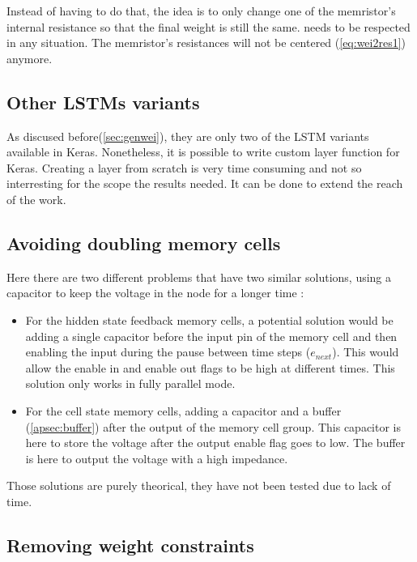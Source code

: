 Instead of having to do that, the idea is to only change one of the memristor's internal resistance so that the final weight is still the same.  needs to be respected in any situation. The memristor's resistances will not be centered (\cref{eq:wei2res1}) anymore.

\subsection{Other \acp{LSTM} variants}

As discused before(\cref{sec:genwei}), they are only two of the \ac{LSTM} variants available in Keras. Nonetheless, it is possible to write custom layer function for Keras. Creating a layer from scratch is very time consuming and not so interresting for the scope the results needed. It can be done to extend the reach of the work.

\subsection{Avoiding doubling memory cells}\label{subsec:noDoubleMemcell}

Here there are two different problems that have two similar solutions, using a capacitor to keep the voltage in the node for a longer time :
\begin{itemize}
  \item For the hidden state feedback memory cells, a potential solution would be adding a single capacitor before the input pin of the memory cell and then enabling the input during the pause between time steps ($e_{next}$). This would allow the enable in and enable out flags to be high at different times. This solution only works in fully parallel mode.
  \item For the cell state memory cells, adding a capacitor and a buffer (\cref{apsec:buffer}) after the output of the memory cell group. This capacitor is here to store the voltage after the output enable flag goes to low. The buffer is here to output the voltage with a high impedance.
\end{itemize}

Those solutions are purely theorical, they have not been tested due to lack of time.

\subsection{Removing weight constraints}\label{subsec:noCons}

